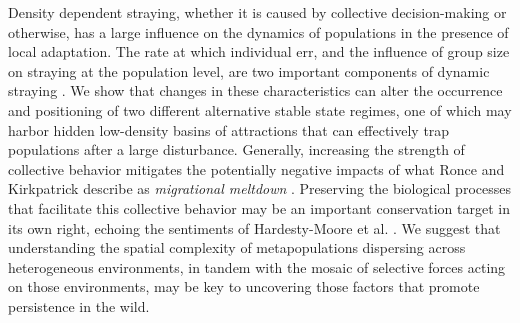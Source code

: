 \documentclass{revtex4}
\begin{document}
Density dependent straying, whether it is caused by collective decision-making or otherwise, has a large influence on the dynamics of populations in the presence of local adaptation.
The rate at which individual err, and the influence of group size on straying at the population level, are two important components of dynamic straying \cite{Berdahl:2016dx}.
We show that changes in these characteristics can alter the occurrence and positioning of two different alternative stable state regimes, one of which may harbor hidden low-density basins of attractions that can effectively trap populations after a large disturbance.
Generally, increasing the strength of collective behavior mitigates the potentially negative impacts of what Ronce and Kirkpatrick describe as \emph{migrational meltdown} \cite{Ronce:2001dp}.
Preserving the biological processes that facilitate this collective behavior may be an important conservation target in its own right, echoing the sentiments of  Hardesty-Moore et al. \citep{HardestyMoore:wg}. 
We suggest that understanding the spatial complexity of metapopulations dispersing across heterogeneous environments, in tandem with the mosaic of selective forces acting on those environments, may be key to uncovering those factors that promote persistence in the wild.
\\ \\
\end{document}
